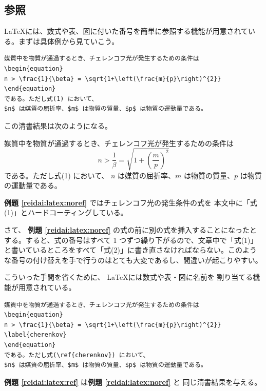 \subsection{参照}
\label{sec:latex:reference}

\LaTeX には、数式や表、図に付いた番号を簡単に参照する機能が用意されている。まずは具体例から見ていこう。
\begin{reidai}
\label{reidai:latex:noref}
\begin{verbatim}
媒質中を物質が通過するとき、チェレンコフ光が発生するための条件は
\begin{equation}
n > \frac{1}{\beta} = \sqrt{1+\left(\frac{m}{p}\right)^{2}}
\end{equation}
である。ただし式(1) において、
$n$ は媒質の屈折率、$m$ は物質の質量、$p$ は物質の運動量である。
\end{verbatim}
\end{reidai} \noindent
この清書結果は次のようになる。
\begin{kekka}
  媒質中を物質が通過するとき、チェレンコフ光が発生するための条件は
  \begin{equation}
    n > \frac{1}{\beta} = \sqrt{1+\left(\frac{m}{p}\right)^{2}}
  \end{equation}
  である。ただし式(1) において、
  $n$ は媒質の屈折率、$m$ は物質の質量、$p$ は物質の運動量である。\\
\end{kekka} \noindent
\textbf{例題 \ref{reidai:latex:noref}} ではチェレンコフ光の発生条件の式を
本文中に「式(1)」とハードコーティングしている。

さて、 \textbf{例題 \ref{reidai:latex:noref}} の式の前に別の式を挿入することになったとする。すると、式の番号はすべて 1 つずつ繰り下がるので、文章中で「式(1)」と書いているところをすべて「式(2)」に書き直さなければならない。このような番号の付け替えを手で行うのはとても大変であるし、間違いが起こりやすい。

こういった手間を省くために、 \LaTeX には数式や表・図に名前を
割り当てる機能が用意されている。
\begin{reidai}
\label{reidai:latex:ref}
\begin{verbatim}
媒質中を物質が通過するとき、チェレンコフ光が発生するための条件は
\begin{equation}
n > \frac{1}{\beta} = \sqrt{1+\left(\frac{m}{p}\right)^{2}} \label{cherenkov}
\end{equation}
である。ただし式(\ref{cherenkov}) において、
$n$ は媒質の屈折率、$m$ は物質の質量、$p$ は物質の運動量である。
\end{verbatim}
\end{reidai} \noindent
\textbf{例題 \ref{reidai:latex:ref}} は\textbf{例題 \ref{reidai:latex:noref}} と
同じ清書結果を与える。

